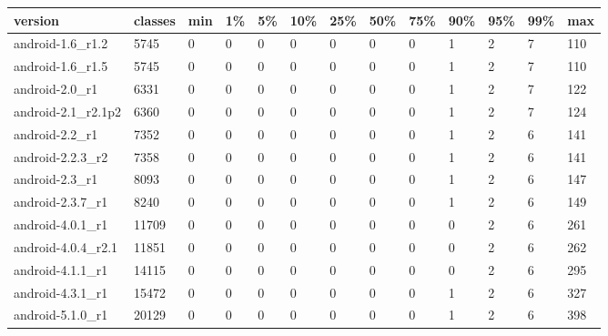 \begin{tabular}{|l|l|l|l|l|l|l|l|l|l|l|l|l|}
\hline
version&classes&min&1\%&5\%&10\%&25\%&50\%&75\%&90\%&95\%&99\%&max\\
\hline
android-1.6\_r1.2&5745&0&0&0&0&0&0&0&1&2&7&110\\
\hline
android-1.6\_r1.5&5745&0&0&0&0&0&0&0&1&2&7&110\\
\hline
android-2.0\_r1&6331&0&0&0&0&0&0&0&1&2&7&122\\
\hline
android-2.1\_r2.1p2&6360&0&0&0&0&0&0&0&1&2&7&124\\
\hline
android-2.2\_r1&7352&0&0&0&0&0&0&0&1&2&6&141\\
\hline
android-2.2.3\_r2&7358&0&0&0&0&0&0&0&1&2&6&141\\
\hline
android-2.3\_r1&8093&0&0&0&0&0&0&0&1&2&6&147\\
\hline
android-2.3.7\_r1&8240&0&0&0&0&0&0&0&1&2&6&149\\
\hline
android-4.0.1\_r1&11709&0&0&0&0&0&0&0&0&2&6&261\\
\hline
android-4.0.4\_r2.1&11851&0&0&0&0&0&0&0&0&2&6&262\\
\hline
android-4.1.1\_r1&14115&0&0&0&0&0&0&0&0&2&6&295\\
\hline
android-4.3.1\_r1&15472&0&0&0&0&0&0&0&1&2&6&327\\
\hline
android-5.1.0\_r1&20129&0&0&0&0&0&0&0&1&2&6&398\\
\hline
\end{tabular}
